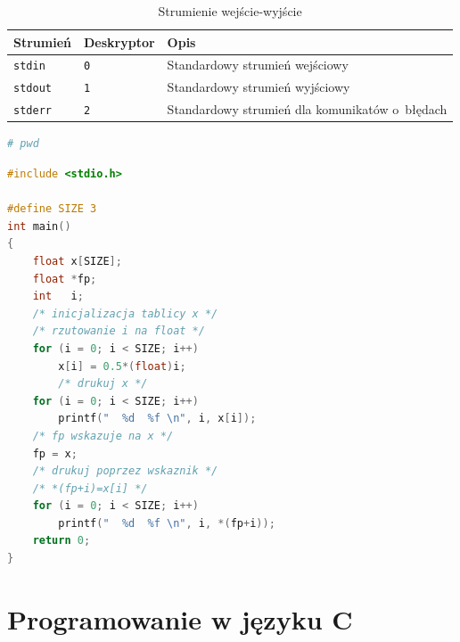 \documentclass[11pt,twoside,a4paper]{article}
\begin{document}
\begin{table}[h!]
\centering
\caption{Strumienie wejście-wyjście}
\setlength{\arrayrulewidth}{1pt}
\setlength{\tabcolsep}{6pt}
\renewcommand{\arraystretch}{1.2}
\begin{tabular}{ |p{}|p{}|p{}|}
\hline \rowcolor{gray}
\textbf{Strumień} & \textbf{Deskryptor} & \textbf{Opis} \\ \hline
\mbox{\lstinline{stdin}} & \mbox{\lstinline{0}} &  Standardowy strumień wejściowy  \\ \hline 
\mbox{\lstinline{stdout}} & \mbox{\lstinline{1}} &  Standardowy strumień wyjściowy  \\ \hline 
\mbox{\lstinline{stderr}} & \mbox{\lstinline{2}} &  Standardowy strumień dla komunikatów o~błędach  \\ \hline 
\end{tabular}
\label{tab:strumienie}
\end{table}








\cleardoublepage 
\begin{lstlisting}[label=jakiskod,caption=to jest mój kod,language=bash]
 # pwd
\end{lstlisting}


\begin{lstlisting}[label=jakiskod2,caption=nowy kod,language=C]
#include <stdio.h>

#define SIZE 3
int main()
{
	float x[SIZE];
	float *fp;
    int   i;
    /* inicjalizacja tablicy x */
    /* rzutowanie i na float */
    for (i = 0; i < SIZE; i++)
    	x[i] = 0.5*(float)i;
    	/* drukuj x */
    for (i = 0; i < SIZE; i++)
    	printf("  %d  %f \n", i, x[i]);
    /* fp wskazuje na x */
    fp = x;
    /* drukuj poprzez wskaznik */
    /* *(fp+i)=x[i] */
    for (i = 0; i < SIZE; i++)
    	printf("  %d  %f \n", i, *(fp+i));
    return 0;
}

\end{lstlisting}

\clearpage
\section{Programowanie w języku C}

\tableofcontents

\renewcommand{\listtheoremname}{Spis przykładów}
\listoftheorems[ignoreall,show=example]


\cleardoublepage 
{}
{}
\listoffigures

{}
\listoftables

\cleardoublepage

\nocite{*}
 \label{pismiennictwo}

\end{document}
